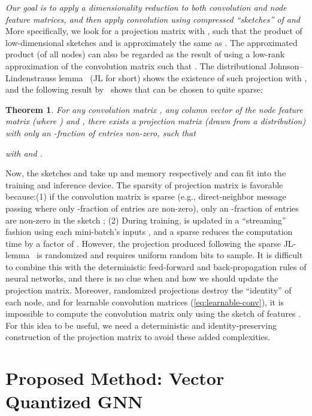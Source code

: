 \documentclass{article}
\newtheorem{theorem}{Theorem}
\renewcommand{\emph}[1]{\textit{#1}}
\begin{document}
\emph{Our goal is to apply a dimensionality reduction to both convolution and node feature matrices, and then apply convolution using compressed ``sketches'' of  and } More specifically, we look for a projection matrix  with , such that the product of low-dimensional sketches  and  is approximately the same as . The approximated product (of all nodes)  can also be regarded as the result of using a low-rank approximation  of the convolution matrix such that . The distributional Johnson–Lindenstrauss lemma~\citep{johnson1984extensions} (JL for short) shows the existence of such projection  with , and the following result by~\citet{kane2014sparser} shows that  can be chosen to quite sparse:
\begin{theorem}
\label{thm:jl-lemma}
    For any convolution matrix , any column vector  of the node feature matrix  (where ) and , there exists a projection matrix  (drawn from a distribution) with only an -fraction of entries non-zero, such that
    
    with  and .
\end{theorem}
Now, the sketches  and  take up  and  memory respectively and can fit into the training and inference device. The sparsity of projection matrix  is favorable because:(1) if the convolution matrix  is sparse (e.g., direct-neighbor message passing where only -fraction of entries are non-zero), only an -fraction of entries are non-zero in the sketch ; (2) During training,  is updated in a ``streaming'' fashion using each mini-batch's inputs , and a sparse  reduces the computation time by a factor of . However, the projection  produced following the sparse JL-lemma~\citep{kane2014sparser} is randomized and requires  uniform random bits to sample. It is difficult to combine this with the deterministic feed-forward and back-propagation rules of neural networks, and there is no clue when and how we should update the projection matrix. Moreover, randomized projections destroy the ``identity'' of each node, and for learnable convolution matrices (\cref{eq:learnable-conv}), it is impossible to compute the convolution matrix only using the sketch of features . For this idea to be useful, we need a deterministic and identity-preserving construction of the projection matrix  to avoid these added complexities.

%
 \section{Proposed Method: Vector Quantized GNN}
\label{sec:method}
\end{document}
